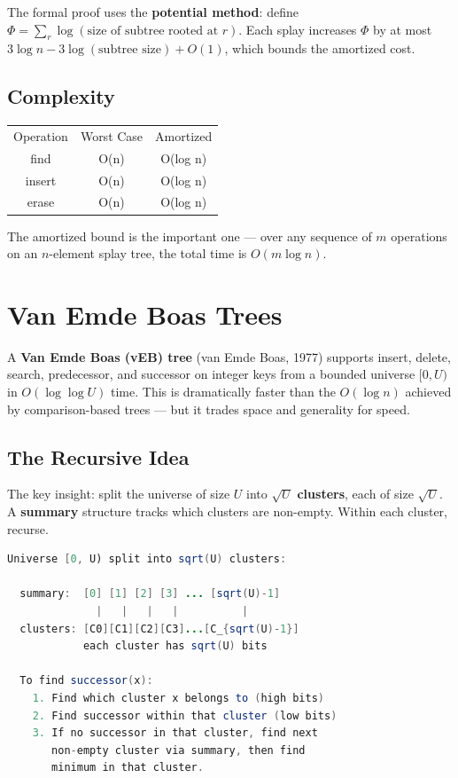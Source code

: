 The formal proof uses the \textbf{potential method}: define $\Phi = \sum_r \log(\text{size of subtree rooted at } r)$. Each splay increases $\Phi$ by at most $3 \log n - 3 \log(\text{subtree size}) + O(1)$, which bounds the amortized cost.

\subsection{Complexity}

\begin{center}
\begin{tabular}{ccc}
\toprule
Operation & Worst Case & Amortized \\
find & O(n) & O(log n) \\
insert & O(n) & O(log n) \\
erase & O(n) & O(log n) \\

\bottomrule
\end{tabular}
\end{center}

The amortized bound is the important one --- over any sequence of $m$ operations on an $n$-element splay tree, the total time is $O(m \log n)$.

\section{Van Emde Boas Trees}

A \textbf{Van Emde Boas (vEB) tree} (van Emde Boas, 1977) supports insert, delete, search, predecessor, and successor on integer keys from a bounded universe $[0, U)$ in $O(\log \log U)$ time. This is dramatically faster than the $O(\log n)$ achieved by comparison-based trees --- but it trades space and generality for speed.

\subsection{The Recursive Idea}

The key insight: split the universe of size $U$ into $\sqrt{U}$ \textbf{clusters}, each of size $\sqrt{U}$. A \textbf{summary} structure tracks which clusters are non-empty. Within each cluster, recurse.

\begin{lstlisting}[language=Java]
  Universe [0, U) split into sqrt(U) clusters:

  summary:  [0] [1] [2] [3] ... [sqrt(U)-1]
              |   |   |   |          |
  clusters: [C0][C1][C2][C3]...[C_{sqrt(U)-1}]
            each cluster has sqrt(U) bits

  To find successor(x):
    1. Find which cluster x belongs to (high bits)
    2. Find successor within that cluster (low bits)
    3. If no successor in that cluster, find next
       non-empty cluster via summary, then find
       minimum in that cluster.
\end{lstlisting}

